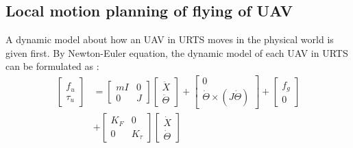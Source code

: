 \documentclass[journal,12pt,onecolumn,draftclsnofoot,]{IEEEtran}
\begin{document}
\subsection{Local motion planning of flying of UAV}
A dynamic model about how an UAV in URTS moves in the physical world is given first. By Newton-Euler equation, the dynamic model of each UAV in URTS can be formulated as \cite{sabatino2015quadrotor}:
\begin{equation} \label{eq:uav} 
    \begin{split}
        \begin{bmatrix}
            f_u \\ \tau_u
        \end{bmatrix}&=\begin{bmatrix}
            mI & 0 \\ 0 & J
        \end{bmatrix}\begin{bmatrix}
            \ddot{X} \\ \ddot{\Theta}
        \end{bmatrix}+\begin{bmatrix}
            0 \\ \dot{\Theta}\times(J\dot{\Theta})
        \end{bmatrix}+\begin{bmatrix}
            f_g \\ 0
        \end{bmatrix}
        \\
        &+\begin{bmatrix}
            K_F & 0 \\
            0 & K_\tau
        \end{bmatrix}\begin{bmatrix}
            \dot{X} \\ \dot{\Theta}
        \end{bmatrix}
    \end{split}
\end{equation}
\end{document}
